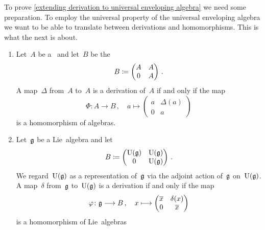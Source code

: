 \begin{fluff}
	To prove \cref{extending derivation to universal enveloping algebra} we need some preparation.
	To employ the universal property of the universal enveloping algebra we want to be able to translate between derivations and homomorphisms.
	This is what the next  is about.
\end{fluff}


\begin{lemma}
	\label{translating between derivations and homomorphisms}
	\leavevmode
	\begin{enumerate}
		\item
			Let~$A$ be a~\algebra{$\kf$} and let~$B$ be the~\algebra{$\kf$}
			\[
				B
				\coloneqq
				\begin{pmatrix}
					A & A \\
					0 & A
				\end{pmatrix} \,.
			\]
			A map~$\Delta$ from~$A$ to~$A$ is a derivation of~$A$ if and only if the map
			\[
				\Phi
				\colon
				A
				\to
				B \,,
				\quad
				a
				\mapsto
				\begin{pmatrix}
					a & \Delta(a) \\
					0 & a
				\end{pmatrix}
			\]
			is a homomorphism of algebras.
		\item
			Let~$\mathfrak{g}$ be a Lie~algebra and let
			\[
				B
				\coloneqq
				\begin{pmatrix}
					\operatorname{U}(\mathfrak{g})  & \operatorname{U}(\mathfrak{g})  \\
					0             & \operatorname{U}(\mathfrak{g})
				\end{pmatrix} \,.
			\]
			We regard~$\operatorname{U}(\mathfrak{g})$ as a representation of~$\mathfrak{g}$ via the adjoint action of~$\mathfrak{g}$ on~$\operatorname{U}(\mathfrak{g})$.
			A map~$\delta$ from~$\mathfrak{g}$ to~$\operatorname{U}(\mathfrak{g})$ is a derivation if and only if the map
			\[
				\varphi
				\colon
				\glie
				\to
				B \,,
				\quad
				x
				\mapsto
				\begin{pmatrix}
					\class{x} & \delta(x) \\
					0         & \class{x}
				\end{pmatrix}
			\]
			is a homomorphism of Lie~algebras
	\end{enumerate}
\end{lemma}


